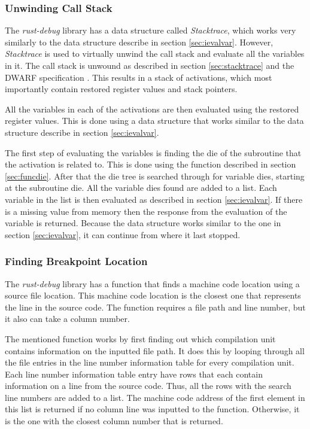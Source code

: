 \subsubsection{Unwinding Call Stack}
The \emph{rust-debug} library has a data structure called \emph{Stacktrace}, which works very similarly to the data structure describe in section \ref{sec:ievalvar}.
However, \emph{Stacktrace} is used to virtually unwind the call stack and evaluate all the variables in it.
The call stack is unwound as described in section \ref{sec:stacktrace} and the \gls{DWARF} specification \cite{dwarf}.
This results in a stack of activations, which most importantly contain restored register values and stack pointers.


All the variables in each of the activations are then evaluated using the restored register values.
This is done using a data structure that works similar to the data structure describe in section \ref{sec:ievalvar}.

The first step of evaluating the variables is finding the \gls{die} of the subroutine that the activation is related to.
This is done using the function described in section \ref{sec:funcdie}.
After that the \gls{die} tree is searched through for variable \glspl{die}, starting at the subroutine \gls{die}.
All the variable \glspl{die} found are added to a list.
Each variable in the list is then evaluated as described in section \ref{sec:ievalvar}.
If there is a missing value from memory then the response from the evaluation of the variable is returned.
Because the data structure works similar to the one in section \ref{sec:ievalvar}, it can continue from where it last stopped.


\subsubsection{Finding Breakpoint Location}
The \emph{rust-debug} library has a function that finds a machine code location using a source file location.
This machine code location is the closest one that represents the line in the source code.
The function requires a file path and line number, but it also can take a column number.


The mentioned function works by first finding out which compilation unit contains information on the inputted file path.
It does this by looping through all the file entries in the line number information table for every compilation unit.
Each line number information table entry have rows that each contain information on a line from the source code.
Thus, all the rows with the search line numbers are added to a list.
The machine code address of the first element in this list is returned if no column line was inputted to the function.
Otherwise, it is the one with the closest column number that is returned.




